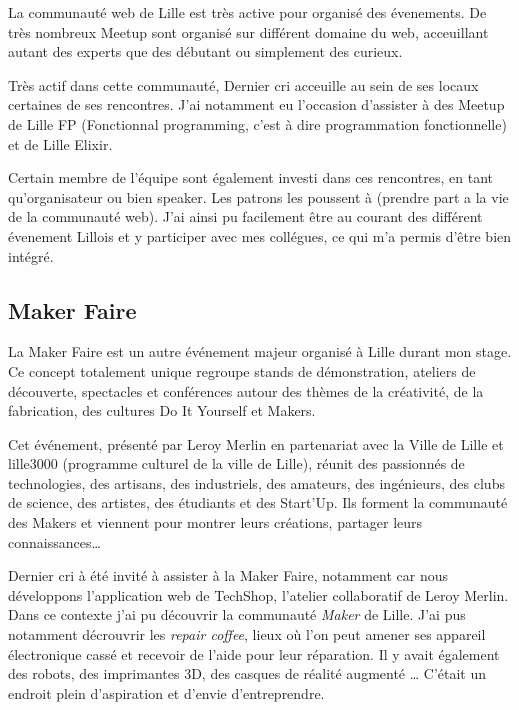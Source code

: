 \bigskip

La communauté web de Lille est très active pour organisé des évenements.
De très nombreux Meetup sont organisé sur différent domaine du web,
acceuillant autant des experts que des débutant ou simplement des
curieux.

\bigskip

Très actif dans cette communauté, Dernier cri acceuille au sein de ses
locaux certaines de ses rencontres. J'ai notamment eu l'occasion
d'assister à des Meetup de Lille FP (Fonctionnal programming, c'est à
dire programmation fonctionnelle) et de Lille Elixir.

\bigskip

Certain membre de l'équipe sont également investi dans ces rencontres,
en tant qu'organisateur ou bien speaker. Les patrons les poussent à
(prendre part a la vie de la communauté web). J'ai ainsi pu facilement
être au courant des différent évenement Lillois et y participer avec mes
collégues, ce qui m'a permis d'être bien intégré.

\bigskip

\subsection{Maker Faire}\label{maker-faire}

\bigskip

La Maker Faire est un autre événement majeur organisé à Lille durant mon
stage. Ce concept totalement unique regroupe stands de démonstration,
ateliers de découverte, spectacles et conférences autour des thèmes de
la créativité, de la fabrication, des cultures Do It Yourself et Makers.

\bigskip

Cet événement, présenté par Leroy Merlin en partenariat avec la Ville de
Lille et lille3000 (programme culturel de la ville de Lille), réunit des
passionnés de technologies, des artisans, des industriels, des amateurs,
des ingénieurs, des clubs de science, des artistes, des étudiants et des
Start'Up. Ils forment la communauté des Makers et viennent pour montrer
leurs créations, partager leurs connaissances\ldots{}

\bigskip

Dernier cri à été invité à assister à la Maker Faire, notamment car nous
développons l'application web de TechShop, l'atelier collaboratif de
Leroy Merlin. Dans ce contexte j'ai pu découvrir la communauté
\emph{Maker} de Lille. J'ai pus notamment décrouvrir les \emph{repair
coffee}, lieux où l'on peut amener ses appareil électronique cassé et
recevoir de l'aide pour leur réparation. Il y avait également des
robots, des imprimantes 3D, des casques de réalité augmenté \ldots{}
C'était un endroit plein d'aspiration et d'envie d'entreprendre.

